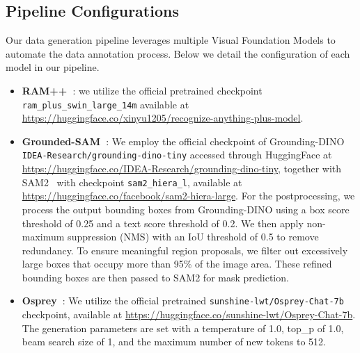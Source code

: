\subsection{Pipeline Configurations}
Our data generation pipeline leverages multiple Visual Foundation Models to automate the data annotation process. Below we detail the configuration of each model in our pipeline.
\begin{itemize}[leftmargin=*,itemsep=1pt]
    \item \textbf{RAM++~\cite{ram_pp}}: we utilize the official pretrained checkpoint \texttt{ram\_plus\_swin\_large\_14m} available at \url{https://huggingface.co/xinyu1205/recognize-anything-plus-model}.
    \item \textbf{Grounded-SAM~\cite{ren2024grounded}}: We employ the official checkpoint of Grounding-DINO~\cite{liu2023grounding} \texttt{IDEA-Research/grounding-dino-tiny} accessed through HuggingFace at \url{https://huggingface.co/IDEA-Research/grounding-dino-tiny}, together with SAM2~\cite{ravi2024sam} with checkpoint \texttt{sam2\_hiera\_l}, available at \url{https://huggingface.co/facebook/sam2-hiera-large}. For the postprocessing, we process the output bounding boxes from Grounding-DINO using a box score threshold of 0.25 and a text score threshold of 0.2. We then apply non-maximum suppression (NMS) with an IoU threshold of 0.5 to remove redundancy. To ensure meaningful region proposals, we filter out excessively large boxes that occupy more than 95\% of the image area. These refined bounding boxes are then passed to SAM2 for mask prediction.
    \item \textbf{Osprey~\cite{yuan2024osprey}}: We utilize the official pretrained \texttt{sunshine-lwt/Osprey-Chat-7b} checkpoint, available at \url{https://huggingface.co/sunshine-lwt/Osprey-Chat-7b}. The generation parameters are set with a temperature of 1.0, top\_p of 1.0, beam search size of 1, and the maximum number of new tokens to 512.
\end{itemize}





